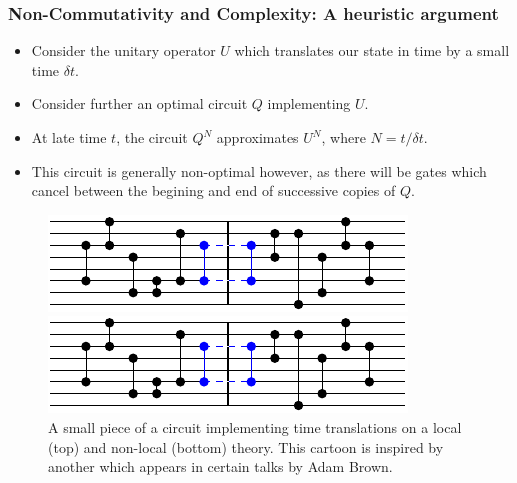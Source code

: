 \documentclass[8pt,aspectratio=169]{beamer}
\begin{document}
\begin{frame}
\frametitle{Non-Commutativity and Complexity: A heuristic argument}

\begin{minipage}[t]{0.5\linewidth}

\begin{itemize}

\item Consider the unitary operator $U$ which translates our state in time by a small time $\delta t$. 

\item Consider further an optimal circuit $Q$ implementing $U$.

\item At late time $t$, the circuit $Q^N$ approximates $U^N$, where $N= t/\delta t$.

\item This circuit is generally non-optimal however, as there will be gates which cancel between the begining and end of successive copies of $Q$.

\end{itemize}

\end{minipage}\hfill
%
\begin{minipage}[t]{0.48\linewidth}

\begin{figure}
    \begin{center}
    
        \includegraphics[scale=1]{animation/animation_2}    
        
        \vspace{2mm}
        
        \includegraphics[scale=1]{animation/animation_2}    
    
    \end{center}
    \caption{A small piece of a circuit implementing time translations on a local (top) and non-local (bottom) theory. This cartoon is inspired by another which appears in certain talks by Adam Brown.}
\end{figure}

\end{minipage}

\end{frame}
\end{document}
